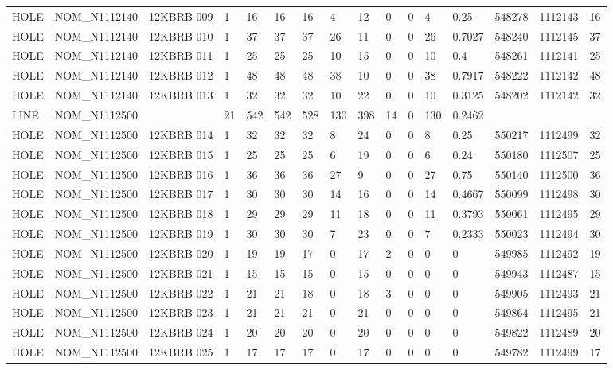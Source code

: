 \begin{table}[ht]
\begin{tabular}{llllllllllllllll}
HOLE & NOM\_N1112140 & 12KBRB 009 & 1 & 16 & 16 & 16 & 4 & 12 & 0 & 0 & 4 & 0.25 & 548278 & 1112143 & 16 \\
HOLE & NOM\_N1112140 & 12KBRB 010 & 1 & 37 & 37 & 37 & 26 & 11 & 0 & 0 & 26 & 0.7027 & 548240 & 1112145 & 37 \\
HOLE & NOM\_N1112140 & 12KBRB 011 & 1 & 25 & 25 & 25 & 10 & 15 & 0 & 0 & 10 & 0.4 & 548261 & 1112141 & 25 \\
HOLE & NOM\_N1112140 & 12KBRB 012 & 1 & 48 & 48 & 48 & 38 & 10 & 0 & 0 & 38 & 0.7917 & 548222 & 1112142 & 48 \\
HOLE & NOM\_N1112140 & 12KBRB 013 & 1 & 32 & 32 & 32 & 10 & 22 & 0 & 0 & 10 & 0.3125 & 548202 & 1112142 & 32 \\
LINE & NOM\_N1112500 &  & 21 & 542 & 542 & 528 & 130 & 398 & 14 & 0 & 130 & 0.2462 &  &  &  \\
HOLE & NOM\_N1112500 & 12KBRB 014 & 1 & 32 & 32 & 32 & 8 & 24 & 0 & 0 & 8 & 0.25 & 550217 & 1112499 & 32 \\
HOLE & NOM\_N1112500 & 12KBRB 015 & 1 & 25 & 25 & 25 & 6 & 19 & 0 & 0 & 6 & 0.24 & 550180 & 1112507 & 25 \\
HOLE & NOM\_N1112500 & 12KBRB 016 & 1 & 36 & 36 & 36 & 27 & 9 & 0 & 0 & 27 & 0.75 & 550140 & 1112500 & 36 \\
HOLE & NOM\_N1112500 & 12KBRB 017 & 1 & 30 & 30 & 30 & 14 & 16 & 0 & 0 & 14 & 0.4667 & 550099 & 1112498 & 30 \\
HOLE & NOM\_N1112500 & 12KBRB 018 & 1 & 29 & 29 & 29 & 11 & 18 & 0 & 0 & 11 & 0.3793 & 550061 & 1112495 & 29 \\
HOLE & NOM\_N1112500 & 12KBRB 019 & 1 & 30 & 30 & 30 & 7 & 23 & 0 & 0 & 7 & 0.2333 & 550023 & 1112494 & 30 \\
HOLE & NOM\_N1112500 & 12KBRB 020 & 1 & 19 & 19 & 17 & 0 & 17 & 2 & 0 & 0 & 0 & 549985 & 1112492 & 19 \\
HOLE & NOM\_N1112500 & 12KBRB 021 & 1 & 15 & 15 & 15 & 0 & 15 & 0 & 0 & 0 & 0 & 549943 & 1112487 & 15 \\
HOLE & NOM\_N1112500 & 12KBRB 022 & 1 & 21 & 21 & 18 & 0 & 18 & 3 & 0 & 0 & 0 & 549905 & 1112493 & 21 \\
HOLE & NOM\_N1112500 & 12KBRB 023 & 1 & 21 & 21 & 21 & 0 & 21 & 0 & 0 & 0 & 0 & 549864 & 1112495 & 21 \\
HOLE & NOM\_N1112500 & 12KBRB 024 & 1 & 20 & 20 & 20 & 0 & 20 & 0 & 0 & 0 & 0 & 549822 & 1112489 & 20 \\
HOLE & NOM\_N1112500 & 12KBRB 025 & 1 & 17 & 17 & 17 & 0 & 17 & 0 & 0 & 0 & 0 & 549782 & 1112499 & 17 \\

\end{tabular}
\end{table}
